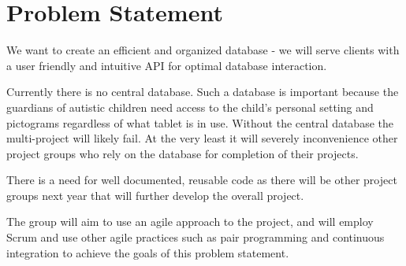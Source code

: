 \section{Problem Statement}
We want to create an efficient and organized database - we will serve clients with a user friendly and intuitive API for optimal database interaction.

Currently there is no central database. Such a database is important because the guardians of autistic children need access to the child's personal setting and pictograms regardless of what tablet is in use. Without the central database the multi-project will likely fail. At the very least it will severely inconvenience other project groups who rely on the database for completion of their projects.

There is a need for well documented, reusable code as there will be other project groups next year that will further develop the overall project.

The group will aim to use an agile approach to the project, and will employ Scrum and use other agile practices such as pair programming and continuous integration to achieve the goals of this problem statement.
